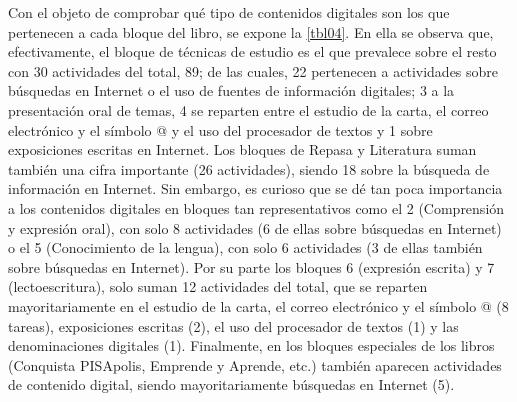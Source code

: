 \documentclass{textolivre}
\begin{document}
Con el objeto de comprobar qué tipo de contenidos digitales son los que pertenecen a cada bloque del libro, se expone la \cref{tbl04}. En ella se observa que, efectivamente, el bloque de técnicas de estudio es el que prevalece sobre el resto con 30 actividades del total, 89; de las cuales, 22 pertenecen a actividades sobre búsquedas en Internet o el uso de fuentes de información digitales; 3 a la presentación oral de temas, 4 se reparten entre el estudio de la carta, el correo electrónico y el símbolo @ y el uso del procesador de textos y 1 sobre exposiciones escritas en Internet. Los bloques de Repasa y Literatura suman también una cifra importante (26 actividades), siendo 18 sobre la búsqueda de información en Internet. Sin embargo, es curioso que se dé tan poca importancia a los contenidos digitales en bloques tan representativos como el 2 (Comprensión y expresión oral), con solo 8 actividades (6 de ellas sobre búsquedas en Internet) o el 5 (Conocimiento de la lengua), con solo 6 actividades (3 de ellas también sobre búsquedas en Internet). Por su parte los bloques 6 (expresión escrita) y 7 (lectoescritura), solo suman 12 actividades del total, que se reparten mayoritariamente en el estudio de la carta, el correo electrónico y el símbolo @ (8 tareas), exposiciones escritas (2), el uso del procesador de textos (1) y las denominaciones digitales (1). Finalmente, en los bloques especiales de los libros (Conquista PISApolis, Emprende y Aprende, etc.) también aparecen actividades de contenido digital, siendo mayoritariamente búsquedas en Internet (5). 
\end{document}
